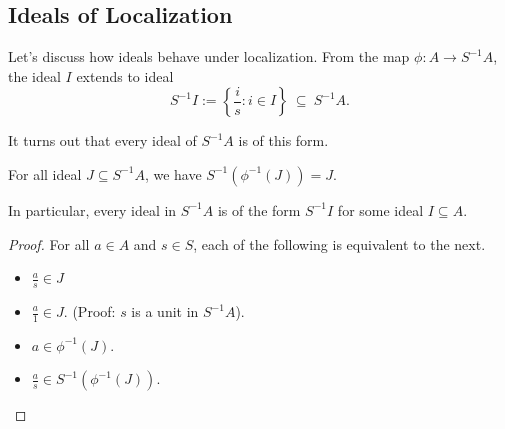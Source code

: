 \subsection{Ideals of Localization}
%     
Let's discuss how ideals behave under localization.
From the map
$\phi : A\to S^{-1}A$, the ideal $I$ extends to ideal
$$S^{-1}I := \left\{\frac is : i\in I\right\} 
\ \subseteq\ S^{-1}A.$$

It turns out that every ideal of $S^{-1}A$ is of this form.
\begin{proposition}
    \label{prop:ideal_is_extended}
    For all ideal $J\subseteq S^{-1}A$,
    we have $S^{-1}(\phi^{-1}(J)) = J$.
    
    \noindent In particular, every ideal in $S^{-1}A$ is of the form 
    $S^{-1}I$ for some ideal $I\subseteq A$.
\end{proposition}
\begin{proof}
For all $a\in A$ and $s\in S$,
each of the following is equivalent to the next.
\begin{itemize}
\item $\frac as\in J$
\item $\frac a1\in J$. (Proof: $s$ is a unit in $S^{-1}A$).
\item $a\in\phi^{-1}(J)$.
\item $\frac as\in S^{-1}(\phi^{-1}(J))$. \qedhere
\end{itemize}
\end{proof}

